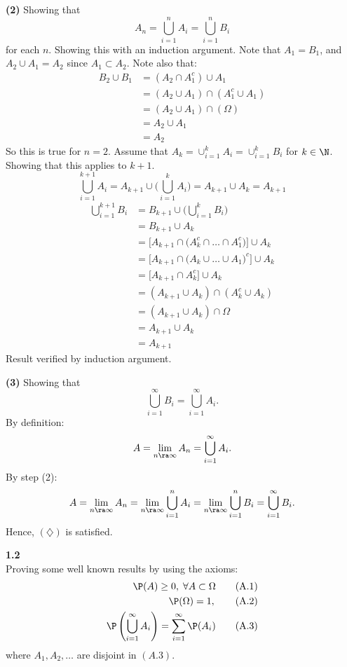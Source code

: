 \medskip\noindent
\textbf{(2)} Showing that 
\[
A_n = \bigcup_{i=1}^n A_i = \bigcup_{i=1}^n B_i
\]
for each $n$. Showing this with an induction argument. Note that $A_1 = B_1$, and $A_2\cup A_1 = A_2$ since $A_1\subset A_2$. Note also that:
\begin{align*}
    B_2\cup B_1 &= (A_2\cap A_1^c)\cup A_1 \\
    &= (A_2\cup A_1)\cap(A_1^c\cup A_1) \\
    &= (A_2\cup A_1)\cap(\Omega) \\
    &= A_2\cup A_1 \\
    &= A_2
\end{align*}
So this is true for $n=2$. Assume that $A_k = \cup_{i=1}^k A_i = \cup_{i=1}^k B_i$ for $k\in\N$. Showing that this applies to $k+1$.
$$
\bigcup_{i=1}^{k+1} A_i = A_{k+1}\cup\Big(\bigcup_{i=1}^{k}A_i\Big) = A_{k+1}\cup A_k = A_{k+1}
$$
\begin{align*}
    \bigcup_{i=1}^{k+1} B_i &= B_{k+1}\cup\Big(\bigcup_{i=1}^{k} B_i\Big)\\
    &= B_{k+1}\cup A_k \\
    &= \Big[A_{k+1}\cap \Big(A_k^c\cap\ldots\cap A_1^c\Big)\Big]\cup A_k \\
    &= \Big[A_{k+1}\cap \Big(A_k\cup\ldots\cup A_1\Big)^c\Big]\cup A_k \\
    &= \Big[A_{k+1}\cap A_k^c\Big]\cup A_k \\
    &= (A_{k+1}\cup A_k)\cap (A_k^c\cup A_k) \\
    &= (A_{k+1}\cup A_k)\cap\Omega \\
    &= A_{k+1}\cup A_k \\
    &= A_{k+1}
\end{align*}
Result verified by induction argument.

\medskip\noindent
\textbf{(3)} Showing that 
\[
\bigcup_{i=1}^\infty B_i = \bigcup_{i=1}^\infty A_i.
\tag{$\diamondsuit$}
\]
By definition:
$$
A = \lim_{n\ra\infty} A_n = \bigcup_{i=1}^\infty A_i.
$$
By step (2):
$$
A = \lim_{n\ra\infty} A_n = \lim_{n\ra\infty}\bigcup_{i=1}^n A_i = \lim_{n\ra\infty}\bigcup_{i=1}^n B_i = \bigcup_{i=1}^\infty B_i.
$$
Hence, $(\diamondsuit)$ is satisfied.

\newpage\noindent
\textbf{1.2}\\  %
Proving some well known results by using the axioms:
\begin{align*}
    \P(A) \geq 0,\;\forall A\subset\Omega \tag{A.1} \\
    \P(\Omega) = 1, \tag{A.2} \\
    \P\left(\bigcup_{i=1}^\infty A_i\right) = \sum_{i=1}^\infty \P(A_i) \tag{A.3}
\end{align*}
where $A_1, A_2,\ldots$ are disjoint in  $(A.3)$.

